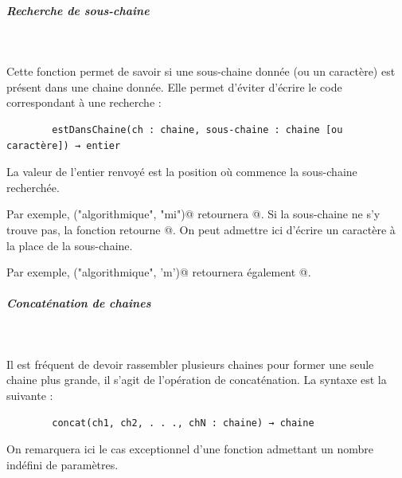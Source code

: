 \documentclass[11pt,a4paper]{article}
\begin{document}
            \par
        
			
		\subparagraph{Recherche de sous-chaine} 
		
					\textcolor{white}{.} \par
				
        Cette fonction permet de savoir si une sous-chaine donn\'ee (ou un caract\`ere) est pr\'esent dans
        une chaine donn\'ee. Elle permet d'\'eviter d'\'ecrire le code correspondant \`a une recherche :
      
            \par
        \begin{verbatim}
        estDansChaine(ch : chaine, sous-chaine : chaine [ou caractère]) → entier
      \end{verbatim}
        La valeur de l'entier renvoy\'e est la position o\`u commence la sous-chaine recherch\'ee. 
      
            \par
        
        Par exemple, \verb@estDansChaine("algorithmique", "mi")@ 
        retournera @. Si la sous-chaine ne s'y trouve
        pas, la fonction retourne @. 
        On peut admettre ici d'\'ecrire un caract\`ere \`a la place de la sous-chaine. 
      
            \par
        
        Par exemple, \verb@estDansChaine("algorithmique", ’m’)@ 
        retournera \'egalement @.
      
            \par
        
			
		\subparagraph{Concat\'enation de chaines} 
		
					\textcolor{white}{.} \par
				
        Il est fr\'equent de devoir rassembler plusieurs chaines pour former une seule chaine plus
        grande, il s'agit de l'op\'eration de concat\'enation. La syntaxe est la suivante :
       
            \par
        \begin{verbatim}
        concat(ch1, ch2, . . ., chN : chaine) → chaine
      \end{verbatim}
        On remarquera ici le cas exceptionnel d'une fonction admettant un nombre ind\'efini de param\`etres.
      
\end{document}
